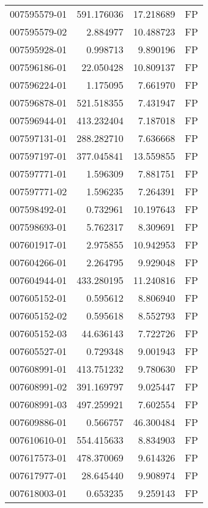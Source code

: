 \begin{tabular}{lrrl}
007595579-01 &  591.176036 &      17.218689 &   FP \\
007595579-02 &    2.884977 &      10.488723 &   FP \\
007595928-01 &    0.998713 &       9.890196 &   FP \\
007596186-01 &   22.050428 &      10.809137 &   FP \\
007596224-01 &    1.175095 &       7.661970 &   FP \\
007596878-01 &  521.518355 &       7.431947 &   FP \\
007596944-01 &  413.232404 &       7.187018 &   FP \\
007597131-01 &  288.282710 &       7.636668 &   FP \\
007597197-01 &  377.045841 &      13.559855 &   FP \\
007597771-01 &    1.596309 &       7.881751 &   FP \\
007597771-02 &    1.596235 &       7.264391 &   FP \\
007598492-01 &    0.732961 &      10.197643 &   FP \\
007598693-01 &    5.762317 &       8.309691 &   FP \\
007601917-01 &    2.975855 &      10.942953 &   FP \\
007604266-01 &    2.264795 &       9.929048 &   FP \\
007604944-01 &  433.280195 &      11.240816 &   FP \\
007605152-01 &    0.595612 &       8.806940 &   FP \\
007605152-02 &    0.595618 &       8.552793 &   FP \\
007605152-03 &   44.636143 &       7.722726 &   FP \\
007605527-01 &    0.729348 &       9.001943 &   FP \\
007608991-01 &  413.751232 &       9.780630 &   FP \\
007608991-02 &  391.169797 &       9.025447 &   FP \\
007608991-03 &  497.259921 &       7.602554 &   FP \\
007609886-01 &    0.566757 &      46.300484 &   FP \\
007610610-01 &  554.415633 &       8.834903 &   FP \\
007617573-01 &  478.370069 &       9.614326 &   FP \\
007617977-01 &   28.645440 &       9.908974 &   FP \\
007618003-01 &    0.653235 &       9.259143 &   FP \\

\end{tabular}
